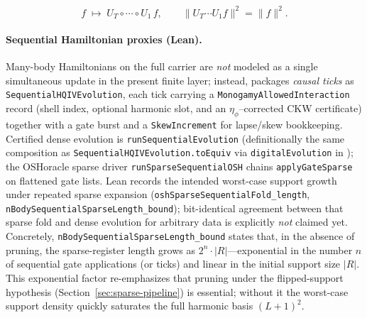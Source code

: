 \documentclass[11pt,a4paper]{article}
\theoremstyle{remark}
\begin{document}
\begin{equation}
  f \;\mapsto\; U_T\circ\cdots\circ U_1\,f,
  \qquad
  \|U_T\cdots U_1 f\|^2=\|f\|^2.
\end{equation}

\paragraph{Sequential Hamiltonian proxies (Lean).}
Many-body Hamiltonians on the full carrier are \emph{not} modeled as a single simultaneous update in the present finite layer; instead,  packages \emph{causal ticks} as \texttt{SequentialHQIVEvolution}, each tick carrying a \texttt{MonogamyAllowedInteraction} record (shell index, optional harmonic slot, and an $\eta_\phi$--corrected CKW certificate) together with a gate burst and a \texttt{SkewIncrement} for lapse/skew bookkeeping.
Certified dense evolution is \texttt{runSequentialEvolution} (definitionally the same composition as \texttt{SequentialHQIVEvolution.toEquiv} via \texttt{digitalEvolution} in ); the OSHoracle sparse driver \texttt{runSparseSequentialOSH} chains \texttt{applyGateSparse} on flattened gate lists.
Lean records the intended worst-case support growth under repeated sparse expansion (\texttt{oshSparseSequentialFold\_length}, \texttt{nBodySequentialSparseLength\_bound}); bit-identical agreement between that sparse fold and dense evolution for arbitrary data is explicitly \emph{not} claimed yet.
Concretely, \texttt{nBodySequentialSparseLength\_bound} states that, in the absence of pruning, the sparse-register length grows as $2^{n}\cdot |R|$---exponential in the number $n$ of sequential gate applications (or ticks) and linear in the initial support size $|R|$. This exponential factor re-emphasizes that pruning under the flipped-support hypothesis (Section~\ref{sec:sparse-pipeline}) is essential; without it the worst-case support density quickly saturates the full harmonic basis $(L+1)^2$.
\end{document}
